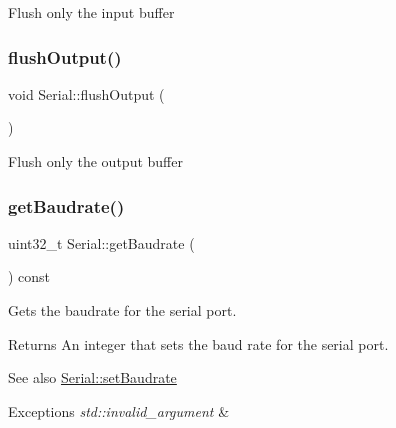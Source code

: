 Flush only the input buffer \mbox{\label{classserial_1_1_serial_a256ee4bb93ab0e79d7a66b50f08dce53}} 
\subsubsection{\texorpdfstring{flush\+Output()}{flushOutput()}}
{\footnotesize\ttfamily void Serial\+::flush\+Output (\begin{DoxyParamCaption}{ }\end{DoxyParamCaption})}

Flush only the output buffer \mbox{\label{classserial_1_1_serial_ac7f119828de9efe1cdf559810926755f}} 
\subsubsection{\texorpdfstring{get\+Baudrate()}{getBaudrate()}}
{\footnotesize\ttfamily uint32\+\_\+t Serial\+::get\+Baudrate (\begin{DoxyParamCaption}{ }\end{DoxyParamCaption}) const}

Gets the baudrate for the serial port.

\begin{DoxyReturn}{Returns}
An integer that sets the baud rate for the serial port.
\end{DoxyReturn}
\begin{DoxySeeAlso}{See also}
\mbox{\hyperlink{classserial_1_1_serial_ad4f7e9edff11b464199e94a43dfd19bf}{Serial\+::set\+Baudrate}}
\end{DoxySeeAlso}

\begin{DoxyExceptions}{Exceptions}
{\em std\+::invalid\+\_\+argument} & \\
\hline
\end{DoxyExceptions}
\mbox{\label{classserial_1_1_serial_ac0d2260901c4d2d99829135341a7d59c}} 
